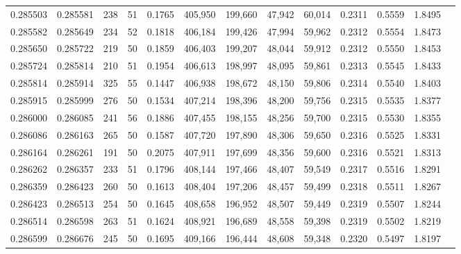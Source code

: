 \begin{tabular}{rrrrrrrrrrrrr}
0.285503 & 0.285581 &   238 &  51 &                                     0.1765 & 405,950 & 199,660 &  47,942 &  60,014 & 0.2311 & 0.5559 & 1.8495 \\
0.285582 & 0.285649 &   234 &  52 &                                     0.1818 & 406,184 & 199,426 &  47,994 &  59,962 & 0.2312 & 0.5554 & 1.8473 \\
0.285650 & 0.285722 &   219 &  50 &                                     0.1859 & 406,403 & 199,207 &  48,044 &  59,912 & 0.2312 & 0.5550 & 1.8453 \\
0.285724 & 0.285814 &   210 &  51 &                                     0.1954 & 406,613 & 198,997 &  48,095 &  59,861 & 0.2313 & 0.5545 & 1.8433 \\
0.285814 & 0.285914 &   325 &  55 &                                     0.1447 & 406,938 & 198,672 &  48,150 &  59,806 & 0.2314 & 0.5540 & 1.8403 \\
0.285915 & 0.285999 &   276 &  50 &                                     0.1534 & 407,214 & 198,396 &  48,200 &  59,756 & 0.2315 & 0.5535 & 1.8377 \\
0.286000 & 0.286085 &   241 &  56 &                                     0.1886 & 407,455 & 198,155 &  48,256 &  59,700 & 0.2315 & 0.5530 & 1.8355 \\
0.286086 & 0.286163 &   265 &  50 &                                     0.1587 & 407,720 & 197,890 &  48,306 &  59,650 & 0.2316 & 0.5525 & 1.8331 \\
0.286164 & 0.286261 &   191 &  50 &                                     0.2075 & 407,911 & 197,699 &  48,356 &  59,600 & 0.2316 & 0.5521 & 1.8313 \\
0.286262 & 0.286357 &   233 &  51 &                                     0.1796 & 408,144 & 197,466 &  48,407 &  59,549 & 0.2317 & 0.5516 & 1.8291 \\
0.286359 & 0.286423 &   260 &  50 &                                     0.1613 & 408,404 & 197,206 &  48,457 &  59,499 & 0.2318 & 0.5511 & 1.8267 \\
0.286423 & 0.286513 &   254 &  50 &                                     0.1645 & 408,658 & 196,952 &  48,507 &  59,449 & 0.2319 & 0.5507 & 1.8244 \\
0.286514 & 0.286598 &   263 &  51 &                                     0.1624 & 408,921 & 196,689 &  48,558 &  59,398 & 0.2319 & 0.5502 & 1.8219 \\
0.286599 & 0.286676 &   245 &  50 &                                     0.1695 & 409,166 & 196,444 &  48,608 &  59,348 & 0.2320 & 0.5497 & 1.8197 \\

\end{tabular}
